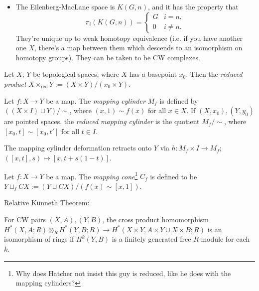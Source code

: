 \documentclass{MetricNotes2023}
\begin{document}
\begin{itemize}
\item The Eilenberg-MacLane space is \(K(G, n)\), and it has the property that 
\[\pi_i(K(G, n))=\begin{cases}
G & i=n,\\
0 & i\neq n.
\end{cases}\]
They're unique up to weak homotopy equivalence (i.e. if you have another one \(X\), there's a map between them which descends to an isomorphism on homotopy groups). They can be taken to be CW complexes. 
\end{itemize}

\begin{definition}
Let \(X\), \(Y\) be topological spaces, where \(X\) has a basepoint \(x_0\). Then the \textit{reduced product} \(X\times_{\text{red}}Y:=(X\times Y)/(x_0 \times Y)\). 
\end{definition}

\begin{definition}
Let \(f : X \to Y\) be a map. The \textit{mapping cylinder} \(M_f\) is defined by \(((X\times I)\sqcup Y)/\sim\), where \((x,1)\sim f(x)\) for all \(x \in X\). If \((X, x_0), (Y, y_0)\) are pointed spaces, the \textit{reduced mapping cylinder} is the quotient \(M_f/\sim\), where \([x_0, t]\sim [x_0, t']\) for all \( t\in I\).
\end{definition}

\begin{remark}\label{2503231306}
The mapping cylinder deformation retracts onto \(Y\) via \(h : M_f \times I\to M_f\); \(([x,t], s)\mapsto [x, t+s(1-t)]\). 
\end{remark}

\begin{definition}
Let \(f : X \to Y\) be a map. The \textit{mapping cone}\footnote{Why does Hatcher not insist this guy is reduced, like he does with the mapping cylinders?} \(C_f\) is defined to be \(Y\sqcup_f CX:=(Y\sqcup CX)/(f(x)\sim [x,1])\). 
\end{definition}

Relative K\"{u}nneth Theorem:

\begin{theorem}
For CW pairs \((X, A), (Y, B)\), the cross product homomorphism \(H^*(X, A; R)\otimes_R H^*(Y,B; R)\to H^*(X\times Y, A\times Y \cup X\times B; R)\) is an isomorphism of rings if \(H^k(Y, B)\) is a finitely generated free \(R\)-module for each \(k\). 
\end{theorem}
\end{document}

